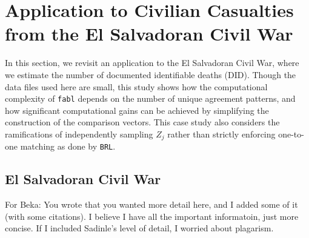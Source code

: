 \documentclass[12pt,letterpaper]{article}
\newcommand{\1}[1]{\mathbb{I}\!\left[#1\right]} %
\begin{document}


\section{Application to Civilian Casualties from the El Salvadoran Civil War}
\label{sec:case-studies}

In this section, we revisit an application to the El Salvadoran Civil War, where we estimate the number of documented identifiable deaths (DID). Though the data files used here are small, this study shows how the computational complexity of \texttt{fabl} depends on the number of unique agreement patterns, and how significant computational gains can be achieved by simplifying the construction of the comparison vectors. This case study also considers the ramifications of 
independently sampling $Z_j$ rather than strictly enforcing one-to-one matching as done by \texttt{BRL}. 


\subsection{El Salvadoran Civil War}
\label{el_salvador}

{
\color{blue} For Beka: You wrote that you wanted more detail here, and I added some of it (with some citations). I believe I have all the important informatoin, just more concise. If I included Sadinle's level of detail, I worried about plagarism.
\vspace{1em}
}
\end{document}
